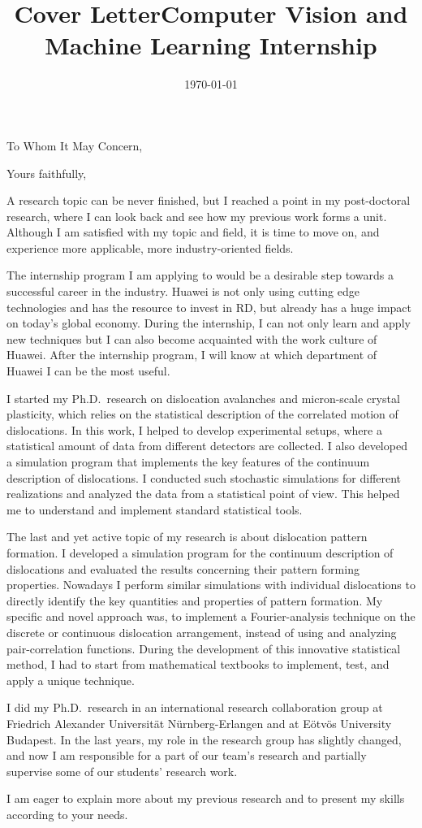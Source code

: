 \documentclass[11pt,a4paper,sans]{moderncv}        %
\title{Cover Letter\newline Computer Vision and Machine Learning Internship}                               %
\begin{document}
\date{\today}
\opening{To Whom It May Concern,}
\closing{Yours faithfully,}
\makelettertitle


A research topic can be never finished, but I reached a point in my post-doctoral research, where I can look back and see how my previous work forms a unit. Although I am satisfied with my topic and field, it is time to move on, and experience more applicable, more industry-oriented fields.

The internship program I am applying to would be a desirable step towards a successful career in the industry. Huawei is not only using cutting edge technologies and has the resource to invest in RD, but already has a huge impact on today's global economy. During the internship, I can not only learn and apply new techniques but I can also become acquainted with the work culture of Huawei. After the internship program, I will know at which department of Huawei I can be the most useful.

I started my Ph.D.\ research on dislocation avalanches and micron-scale crystal plasticity, which relies on the statistical description of the correlated motion of dislocations. In this work, I helped to develop experimental setups, where a statistical amount of data from different detectors are collected. I also developed a simulation program that implements the key features of the continuum description of dislocations. I conducted such stochastic simulations for different realizations and analyzed the data from a statistical point of view. This helped me to understand and implement standard statistical tools.

The last and yet active topic of my research is about dislocation pattern formation. I developed a simulation program for the continuum description of dislocations and evaluated the results concerning their pattern forming properties. Nowadays I perform similar simulations with individual dislocations to directly identify the key quantities and properties of pattern formation. My specific and novel approach was, to implement a Fourier-analysis technique on the discrete or continuous dislocation arrangement, instead of using and analyzing pair-correlation functions. During the development of this innovative statistical method, I had to start from mathematical textbooks to implement, test, and apply a unique technique. 

I did my Ph.D.\ research in an international research collaboration group at Friedrich Alexander Universität Nürnberg-Erlangen and at Eötvös University Budapest. In the last years, my role in the research group has slightly changed, and now I am responsible for a part of our team’s research and partially supervise some of our students’ research work.

I am eager to explain more about my previous research and to present my skills according to your needs.

\makeletterclosing
\end{document}
